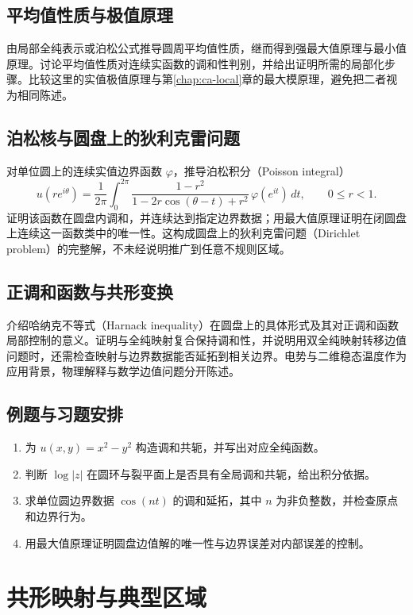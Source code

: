 \documentclass[UTF8,12pt,a4paper,fontset=fandol]{ctexbook}
\begin{document}
\section{平均值性质与极值原理}
由局部全纯表示或泊松公式推导圆周平均值性质，继而得到强最大值原理与最小值原理。讨论平均值性质对连续实函数的调和性判别，并给出证明所需的局部化步骤。比较这里的实值极值原理与第\ref{chap:ca-local}章的最大模原理，避免把二者视为相同陈述。

\section{泊松核与圆盘上的狄利克雷问题}
对单位圆上的连续实值边界函数 $\varphi$，推导泊松积分（Poisson integral）
\begin{equation}
  u(re^{i\theta})=\frac{1}{2\pi}\int_0^{2\pi}
  \frac{1-r^2}{1-2r\cos(\theta-t)+r^2}\,
  \varphi(e^{it})\,dt,\qquad 0\le r<1.
  \label{eq:ca-poisson-integral}
\end{equation}
证明该函数在圆盘内调和，并连续达到指定边界数据；用最大值原理证明在闭圆盘上连续这一函数类中的唯一性。这构成圆盘上的狄利克雷问题（Dirichlet problem）的完整解，不未经说明推广到任意不规则区域。

\section{正调和函数与共形变换}
介绍哈纳克不等式（Harnack inequality）在圆盘上的具体形式及其对正调和函数局部控制的意义。证明与全纯映射复合保持调和性，并说明用双全纯映射转移边值问题时，还需检查映射与边界数据能否延拓到相关边界。电势与二维稳态温度作为应用背景，物理解释与数学边值问题分开陈述。

\section{例题与习题安排}
\begin{enumerate}
  \item 为 $u(x,y)=x^2-y^2$ 构造调和共轭，并写出对应全纯函数。
  \item 判断 $\log|z|$ 在圆环与裂平面上是否具有全局调和共轭，给出积分依据。
  \item 求单位圆边界数据 $\cos(nt)$ 的调和延拓，其中 $n$ 为非负整数，并检查原点和边界行为。
  \item 用最大值原理证明圆盘边值解的唯一性与边界误差对内部误差的控制。
\end{enumerate}

\chapter{共形映射与典型区域}
\label{chap:ca-conformal}
\end{document}

